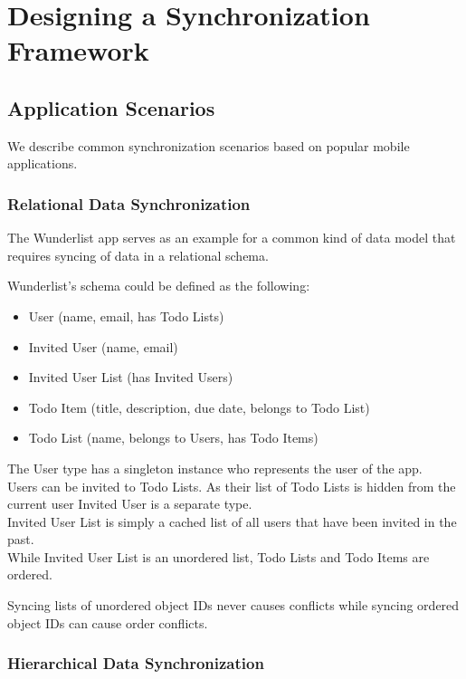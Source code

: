 
\chapter{Designing a Synchronization Framework}\label{main}

\section{Application Scenarios}
We describe common synchronization scenarios based on popular mobile applications.

\subsection{Relational Data Synchronization}

The Wunderlist app serves as an example for a common kind of data model
that requires syncing of data in a relational schema.

Wunderlist's schema could be defined as the following:

\begin{itemize}
\item User (name, email, has Todo Lists)
\item Invited User (name, email)
\item Invited User List (has Invited Users)
\item Todo Item (title, description, due date, belongs to Todo List)
\item Todo List (name, belongs to Users, has Todo Items)
\end{itemize}

The User type has a singleton instance who represents the user of the
app.\\Users can be invited to Todo Lists. As their list of Todo Lists is
hidden from the current user Invited User is a separate type.\\Invited
User List is simply a cached list of all users that have been invited in
the past.\\While Invited User List is an unordered list, Todo Lists and
Todo Items are ordered.

Syncing lists of unordered object IDs never causes conflicts while
syncing ordered object IDs can cause order conflicts.

\subsection{Hierarchical Data Synchronization}

